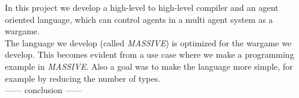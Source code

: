In this project we develop a high-level to high-level compiler and an agent oriented language, which can control agents in a multi agent system as a wargame.\\ \indent
The language we develop (called \textit{MASSIVE}) is optimized for the wargame we develop. This becomes evident from a use case where we make a programming example in \textit{MASSIVE}. Also a goal was to make the language more simple, for example by reducing the number of types.\\ \indent
------ conclusion ------